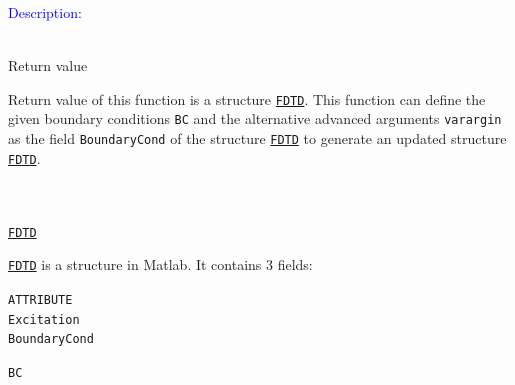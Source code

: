 	\textcolor{blue}{\begin{large}Description:\end{large}}\\
	      Return value 
	\begin{myindentpar}
      Return value of this function is a structure \hyperref[para:FDTD]{\texttt{FDTD}}. This function can define the given boundary conditions \texttt{BC} and the alternative advanced arguments \texttt{varargin} as the field \texttt{BoundaryCond} of the structure  \hyperref[para:FDTD]{\texttt{FDTD}} to generate an updated structure \hyperref[para:FDTD]{\texttt{FDTD}}.  
      \end{myindentpar}
	      \\ \\
	\hyperref[para:FDTD]{\texttt{FDTD}}
  \begin{myindentpar}\hyperref[para:FDTD]{\texttt{FDTD}}  is a structure in Matlab. It contains 3 fields:
       \begin{myindentpar}\texttt{ATTRIBUTE} \\
	      \texttt{Excitation} \\
	      \texttt{BoundaryCond}
      \end{myindentpar}
  \end{myindentpar}
	\texttt{BC}  
